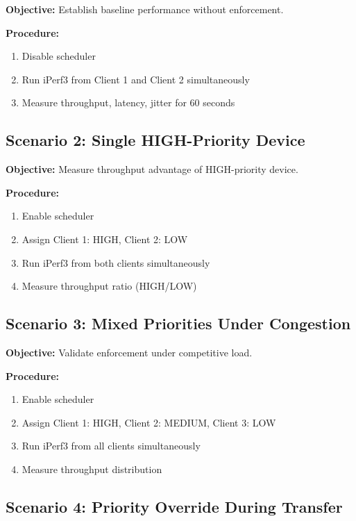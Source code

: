 \textbf{Objective:} Establish baseline performance without \qos enforcement.

\textbf{Procedure:}
\begin{enumerate}
    \item Disable \qos scheduler
    \item Run iPerf3 from Client 1 and Client 2 simultaneously
    \item Measure throughput, latency, jitter for 60 seconds
\end{enumerate}

\subsection{Scenario 2: Single HIGH-Priority Device}

\textbf{Objective:} Measure throughput advantage of HIGH-priority device.

\textbf{Procedure:}
\begin{enumerate}
    \item Enable \qos scheduler
    \item Assign Client 1: HIGH, Client 2: LOW
    \item Run iPerf3 from both clients simultaneously
    \item Measure throughput ratio (HIGH/LOW)
\end{enumerate}

\subsection{Scenario 3: Mixed Priorities Under Congestion}

\textbf{Objective:} Validate \qos enforcement under competitive load.

\textbf{Procedure:}
\begin{enumerate}
    \item Enable \qos scheduler
    \item Assign Client 1: HIGH, Client 2: MEDIUM, Client 3: LOW
    \item Run iPerf3 from all clients simultaneously
    \item Measure throughput distribution
\end{enumerate}

\subsection{Scenario 4: Priority Override During Transfer}

